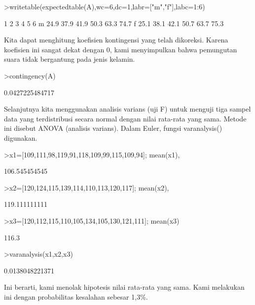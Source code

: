 \documentclass[a4paper,10pt]{article}
\begin{document}
\begin{eulernotebook}
\begin{eulercomment}
\begin{eulercomment}
\begin{eulercomment}
\begin{eulercomment}
\begin{eulerprompt}
>writetable(expectedtable(A),wc=6,dc=1,labr=["m","f"],labc=1:6)
\end{eulerprompt}
\begin{euleroutput}
             1     2     3     4     5     6
       m  24.9  37.9  41.9  50.3  63.3  74.7
       f  25.1  38.1  42.1  50.7  63.7  75.3
\end{euleroutput}
\begin{eulercomment}
Kita dapat menghitung koefisien kontingensi yang telah dikoreksi.
Karena koefisien ini sangat dekat dengan 0, kami menyimpulkan bahwa
pemungutan suara tidak bergantung pada jenis kelamin.
\end{eulercomment}
\begin{eulerprompt}
>contingency(A)
\end{eulerprompt}
\begin{euleroutput}
  0.0427225484717
\end{euleroutput}
\begin{eulercomment}
Selanjutnya kita menggunakan analisis varians (uji F) untuk menguji
tiga sampel data yang terdistribusi secara normal dengan nilai
rata-rata yang sama. Metode ini disebut ANOVA (analisis varians).
Dalam Euler, fungsi varanalysis() digunakan.
\end{eulercomment}
\begin{eulerprompt}
>x1=[109,111,98,119,91,118,109,99,115,109,94]; mean(x1),
\end{eulerprompt}
\begin{euleroutput}
  106.545454545
\end{euleroutput}
\begin{eulerprompt}
>x2=[120,124,115,139,114,110,113,120,117]; mean(x2),
\end{eulerprompt}
\begin{euleroutput}
  119.111111111
\end{euleroutput}
\begin{eulerprompt}
>x3=[120,112,115,110,105,134,105,130,121,111]; mean(x3)
\end{eulerprompt}
\begin{euleroutput}
  116.3
\end{euleroutput}
\begin{eulerprompt}
>varanalysis(x1,x2,x3)
\end{eulerprompt}
\begin{euleroutput}
  0.0138048221371
\end{euleroutput}
\begin{eulercomment}
Ini berarti, kami menolak hipotesis nilai rata-rata yang sama. Kami
melakukan ini dengan probabilitas kesalahan sebesar 1,3\%.


\end{eulercomment}
\end{eulercomment}
\end{eulercomment}
\end{eulercomment}
\end{eulercomment}
\end{eulernotebook}
\end{document}
